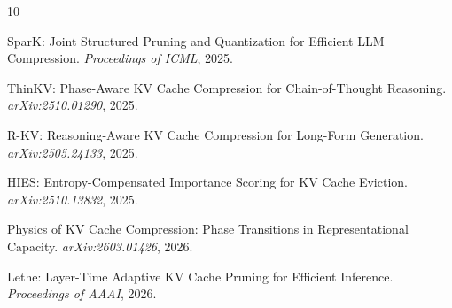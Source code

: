 \documentclass[11pt]{article}
\begin{document}

\begin{thebibliography}{10}

SparK: Joint Structured Pruning and Quantization for Efficient LLM Compression.
\textit{Proceedings of ICML}, 2025.

ThinKV: Phase-Aware KV Cache Compression for Chain-of-Thought Reasoning.
\textit{arXiv:2510.01290}, 2025.

R-KV: Reasoning-Aware KV Cache Compression for Long-Form Generation.
\textit{arXiv:2505.24133}, 2025.

HIES: Entropy-Compensated Importance Scoring for KV Cache Eviction.
\textit{arXiv:2510.13832}, 2025.

Physics of KV Cache Compression: Phase Transitions in Representational Capacity.
\textit{arXiv:2603.01426}, 2026.

Lethe: Layer-Time Adaptive KV Cache Pruning for Efficient Inference.
\textit{Proceedings of AAAI}, 2026.

\end{thebibliography}
\end{document}
